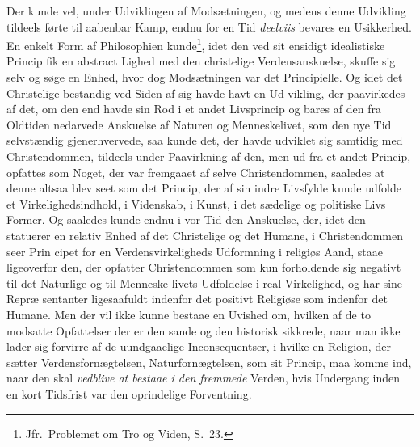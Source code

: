 \begin{enumerate}[label=\arabic*., leftmargin=*, labelsep=1em,
                  topsep=0.35\baselineskip, itemsep=0.35\baselineskip]
  Der kunde vel, under Udviklingen af Modsætningen, og medens denne Udvikling
  tildeels førte til aabenbar Kamp, endnu for en Tid \emph{deelviis} bevares en
  Usikkerhed. En enkelt Form af Philosophien kunde\footnote{Jfr.\ Problemet om
  Tro og Viden, S.\ 23.}, idet den ved sit ensidigt idealistiske Princip fik en
  abstract Lighed med den christelige Verdensanskuelse, skuffe sig selv og søge
  en Enhed, hvor dog Modsætningen var det Principielle. Og idet det Christelige
  bestandig ved Siden af sig havde havt en Ud\-%
vikling, der paavirkedes af det, om den end havde sin Rod i et andet Livsprincip
  og bares af den fra Oldtiden nedarvede Anskuelse af Naturen og Menneskelivet,
  som den nye Tid selvstændig gjenerhvervede, saa kunde det, der havde udviklet
  sig samtidig med Christendommen, tildeels under Paavirkning af den, men ud fra
  et andet Princip, opfattes som Noget, der var fremgaaet af selve
  Christendommen, saaledes at denne altsaa blev seet som det Princip, der af sin
  indre Livsfylde kunde udfolde et Virkelighedsindhold, i Videnskab, i Kunst, i
  det sædelige og politiske Livs Former. Og saaledes kunde endnu i vor Tid den
  Anskuelse, der, idet den statuerer en relativ Enhed af det Christelige og det
  Humane, i Christendommen seer Prin\-%
cipet for en Verdensvirkeligheds Udformning i religiøs Aand, staae ligeoverfor
  den, der opfatter Christendommen som kun forholdende sig negativt til det
  Naturlige og til Menneske\-%
livets Udfoldelse i real Virkelighed, og har sine Repræ\-%
sentanter ligesaafuldt indenfor det positivt Religiøse som indenfor det Humane.
  Men der vil ikke kunne bestaae en Uvished om, hvilken af de to modsatte
  Opfattelser der er den sande og den historisk sikkrede, naar man ikke lader sig
  forvirre af de uundgaaelige Inconsequentser, i hvilke en Religion, der sætter
  Verdensfornægtelsen, Naturfornægtelsen, som sit Princip, maa komme ind, naar
  den skal \emph{vedblive at bestaae i den fremmede} Verden, hvis Undergang inden
  en kort Tidsfrist var den oprindelige Forventning.

\end{enumerate}
